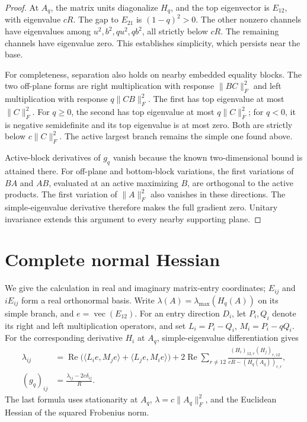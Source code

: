 \documentclass[11pt,a4paper]{article}
\newcommand{\vecop}{\operatorname{vec}}
\newcommand{\norm}[1]{\lVert #1\rVert_F}
\newcommand{\ip}[2]{\langle #1,#2\rangle}
\begin{document}
\begin{proof}
At \(A_q\), the matrix units diagonalize \(H_q\), and the top
eigenvector is \(E_{12}\), with eigenvalue \(cR\).
The gap to \(E_{21}\) is \((1-q)^2>0\).
The other nonzero channels have eigenvalues among
\(u^2,b^2,qu^2,qb^2\), all strictly below \(cR\).
The remaining channels have eigenvalue zero.
This establishes simplicity, which persists near the base.

For completeness, separation also holds on nearby embedded
equality blocks. The two off-plane forms are right multiplication
with response \(\norm{BC}^2\) and left multiplication with
response \(q\norm{CB}^2\).
The first has top eigenvalue at most \(\norm{C}^2\).
For \(q\geq0\), the second has top eigenvalue at most
\(q\norm{C}^2\); for \(q<0\), it is negative semidefinite
and its top eigenvalue is at most zero.
Both are strictly below \(c\norm{C}^2\).
The active largest branch remains the simple one found above.

Active-block derivatives of \(g_q\) vanish because the known
two-dimensional bound is attained there. For off-plane and
bottom-block variations, the first variations of \(BA\) and
\(AB\), evaluated at an active maximizing \(B\), are orthogonal
to the active products. The first variation of \(\norm{A}^2\)
also vanishes in these directions. The simple-eigenvalue
derivative therefore makes the full gradient zero.
Unitary invariance extends this argument to every nearby
supporting plane.
\end{proof}

\section{Complete normal Hessian}
We give the calculation in real and imaginary matrix-entry
coordinates; \(E_{ij}\) and \(iE_{ij}\) form a real orthonormal basis.
Write \(\lambda(A)=\lambda_{\max}(H_q(A))\) on its simple branch,
and \(e=\vecop(E_{12})\).
For an entry direction \(D_i\), let \(P_i,Q_i\) denote its
right and left multiplication operators, and set
\(L_i=P_i-Q_i\), \(M_i=P_i-qQ_i\).
For the corresponding derivative \(H_i\) at \(A_q\),
simple-eigenvalue differentiation gives
\begin{align}
 \lambda_{ij}
 &=\operatorname{Re}\bigl(
   \ip{L_i e}{M_j e}+\ip{L_j e}{M_i e}\bigr)
   +2\operatorname{Re}\sum_{r\neq12}
       \frac{(H_i)_{12,r}(H_j)_{r,12}}
            {cR-(H_q(A_q))_{r,r}}, \label{eq:lambdahess}\\
 (g_q)_{ij}
 &=\frac{\lambda_{ij}-2c\delta_{ij}}R .
 \label{eq:quotienthess}
\end{align}
The last formula uses stationarity at \(A_q\),
\(\lambda=c\norm{A_q}^2\), and the Euclidean Hessian
of the squared Frobenius norm.
\end{document}
